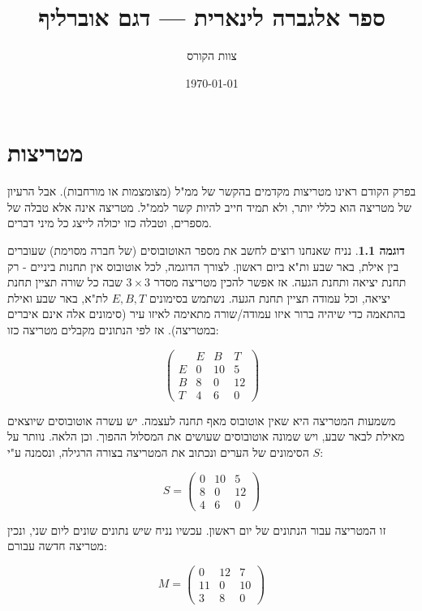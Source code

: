 \documentclass[12pt]{report}
\title{ספר אלגברה לינארית — דגם אוברליף}
\author{צוות הקורס}
\date{\today}
\theoremstyle{plain}
\theoremstyle{definition}
\newtheorem{example}{דוגמה}[chapter]
\newcommand{\0}{\mathbf{0}}
\begin{document}
\maketitle

\chapter{מטריצות}\label{ch:matrices}

בפרק הקודם ראינו מטריצות מקדמים בהקשר של ממ"ל (מצומצמות או מורחבות). אבל הרעיון של מטריצה הוא כללי יותר, ולא תמיד חייב להיות קשר לממ"ל. מטריצה אינה אלא טבלה של מספרים, וטבלה כזו יכולה לייצג כל מיני דברים.

\begin{example}\label{ex:bus}
נניח שאנחנו רוצים לחשב את מספר האוטובוסים (של חברה מסוימת) שעוברים בין אילת, באר שבע ות"א ביום ראשון. לצורך הדוגמה, לכל אוטובוס אין תחנות ביניים - רק תחנת יציאה ותחנת הגעה. אז אפשר להכין מטריצה מסדר 
$3\times 3$
שבה כל שורה תציין תחנת יציאה, וכל עמודה תציין תחנת הגעה. נשתמש בסימונים 
$E, B, T$
לת"א, באר שבע ואילת בהתאמה כדי שיהיה ברור איזו עמודה/שורה מתאימה לאיזו עיר (סימונים אלה אינם איברים במטריצה). אז לפי הנתונים מקבלים מטריצה כזו:


$$
\left(
\begin{array}{c|ccc}
 & E & B & T \\ \hline
E & 0 & 10 & 5 \\
B & 8 & 0 & 12 \\
T & 4 & 6 & 0
\end{array}
\right)
$$

משמעות המטריצה היא שאין אוטובוס מאף תחנה לעצמה. יש עשרה אוטובוסים שיוצאים מאילת לבאר שבע, ויש שמונה אוטובוסים שעושים את המסלול ההפוך. וכן הלאה. נוותר על הסימונים של הערים ונכתוב את המטריצה בצורה הרגילה, ונסמנה ע"י $S$:

$$
S=\left(
\begin{array}{ccc}
0 & 10 & 5 \\
8 & 0 & 12 \\
4 & 6 & 0
\end{array}
\right)
$$

זו המטריצה עבור הנתונים של יום ראשון. עכשיו נניח שיש נתונים שונים ליום שני, ונכין מטריצה חדשה עבורם:

$$
M=\left(
\begin{array}{ccc}
0 & 12 & 7 \\
11 & 0 & 10 \\
3 & 8 & 0
\end{array}
\right)
$$


\end{example}
\end{document}
